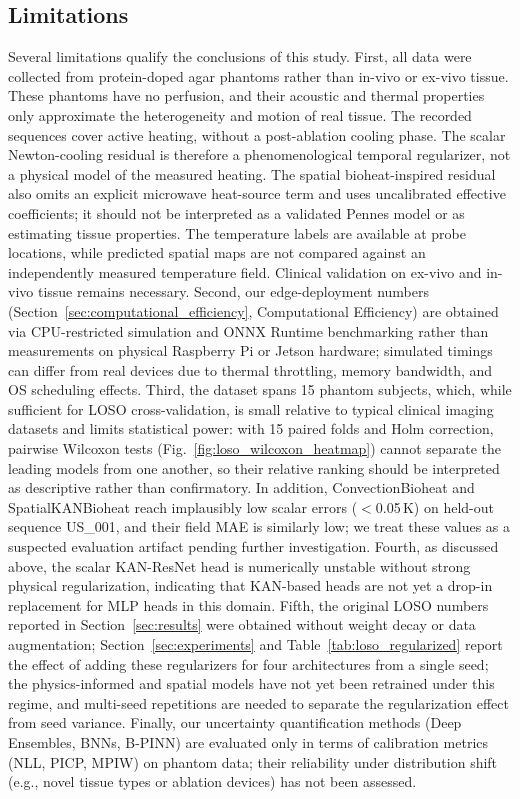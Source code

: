 \documentclass[conference]{IEEEtran}
\begin{document}


\subsection{Limitations}
\label{sec:limitations}
Several limitations qualify the conclusions of this study. First, all data were collected from protein-doped agar phantoms rather than in-vivo or ex-vivo tissue. These phantoms have no perfusion, and their acoustic and thermal properties only approximate the heterogeneity and motion of real tissue. The recorded sequences cover active heating, without a post-ablation cooling phase. The scalar Newton-cooling residual is therefore a phenomenological temporal regularizer, not a physical model of the measured heating. The spatial bioheat-inspired residual also omits an explicit microwave heat-source term and uses uncalibrated effective coefficients; it should not be interpreted as a validated Pennes model or as estimating tissue properties. The temperature labels are available at probe locations, while predicted spatial maps are not compared against an independently measured temperature field. Clinical validation on ex-vivo and in-vivo tissue remains necessary. Second, our edge-deployment numbers (Section~\ref{sec:computational_efficiency}, Computational Efficiency) are obtained via CPU-restricted simulation and ONNX Runtime benchmarking rather than measurements on physical Raspberry Pi or Jetson hardware; simulated timings can differ from real devices due to thermal throttling, memory bandwidth, and OS scheduling effects. Third, the dataset spans 15 phantom subjects, which, while sufficient for LOSO cross-validation, is small relative to typical clinical imaging datasets and limits statistical power: with 15 paired folds and Holm correction, pairwise Wilcoxon tests (Fig.~\ref{fig:loso_wilcoxon_heatmap}) cannot separate the leading models from one another, so their relative ranking should be interpreted as descriptive rather than confirmatory. In addition, ConvectionBioheat and SpatialKANBioheat reach implausibly low scalar errors ($<$0.05\,K) on held-out sequence US\_001, and their field MAE is similarly low; we treat these values as a suspected evaluation artifact pending further investigation. Fourth, as discussed above, the scalar KAN-ResNet head is numerically unstable without strong physical regularization, indicating that KAN-based heads are not yet a drop-in replacement for MLP heads in this domain. Fifth, the original LOSO numbers reported in Section~\ref{sec:results} were obtained without weight decay or data augmentation; Section~\ref{sec:experiments} and Table~\ref{tab:loso_regularized} report the effect of adding these regularizers for four architectures from a single seed; the physics-informed and spatial models have not yet been retrained under this regime, and multi-seed repetitions are needed to separate the regularization effect from seed variance. Finally, our uncertainty quantification methods (Deep Ensembles, BNNs, B-PINN) are evaluated only in terms of calibration metrics (NLL, PICP, MPIW) on phantom data; their reliability under distribution shift (e.g., novel tissue types or ablation devices) has not been assessed.
\end{document}
